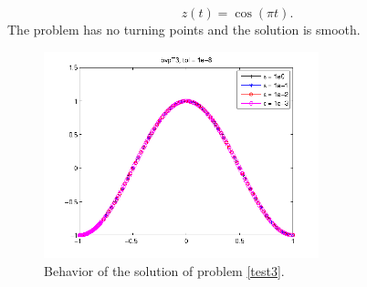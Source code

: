 \documentclass[<options>]{article}
\begin{document}
$$z(t) = \cos(\pi t).$$
The problem has no turning points and the solution is smooth.
\begin{figure}[htb]
\centerline{\includegraphics[height=6cm]{Prob3}}
\caption{Behavior of the solution of problem \ref{test3}.}
\end{figure}
\newpage
\end{document}

